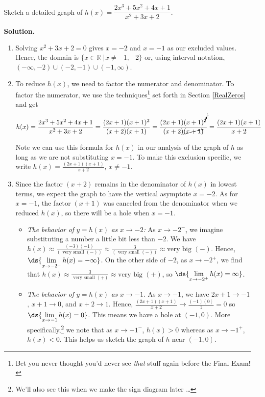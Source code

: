 \documentclass{ximera}
\begin{document}
\begin{example}  Sketch a detailed graph of $h(x) = \dfrac{2x^3+5x^2+4x+1}{x^2+3x+2}$.

{ \bf Solution.}  

\begin{enumerate}

\item   Solving $x^2+3x+2 = 0$ gives $x = -2$ and $x=-1$ as our excluded values.  Hence, the domain is $\{ x \in \mathbb{R} \, | \, x \neq -1, -2 \}$ or, using interval notation,  $(-\infty, -2) \cup (-2, -1) \cup (-1, \infty)$.

\item  To reduce $h(x)$, we need to factor the numerator and denominator.  To factor the numerator, we use the techniques\footnote{Bet you never thought you'd never see \textit{that} stuff again before the Final Exam!} set forth in Section \ref{RealZeros} and get  \[h(x) =  \dfrac{2x^3+5x^2+4x+1}{x^2+3x+2} = \dfrac{(2x+1)(x+1)^2}{(x+2)(x+1)} = \dfrac{ (2x+1) (x+1)^{\cancelto{1}{2}}  }{(x+2)\cancel{(x+1)}} = \dfrac{(2x+1)(x+1)}{x+2} \]

Note we can use this formula for $h(x)$ in our analysis of the graph of $h$ as long as we are not substituting $x=-1$.  To make this exclusion specific, we write $h(x) = \frac{(2x+1)(x+1)}{x+2}$, $x \neq -1$.

\item  Since the factor $(x+2)$ remains in the denominator of $h(x)$ in lowest terms, we expect the graph to have the vertical asymptote $x=-2$.  As for $x=-1$, the factor $(x+1)$ was canceled from the denominator when we reduced $h(x)$, so there will be a hole when $x=-1$.   

\begin{itemize}

\item  \textit{The behavior of $y=h(x)$ as $x \rightarrow -2$:}  As $x \rightarrow -2^{-}$, we imagine substituting a number a little bit less than $-2$. We have $h(x) \approx \frac{(-3)(-1)}{(\text{ very small $(-)$})} \approx \frac{3}{(\text{ very small $(-)$})}\approx \text{very big $(-)$}$.  Hence,  $\ds{\lim_{x \rightarrow -2^{-}} h(x) = - \infty}$.  On the other side of $-2$, as $x \rightarrow -2^{+}$, we find that $h(x) \approx \frac{3}{\text{ very small $(+)$}} \approx \text{very big $(+)$}$, so  $\ds{\lim_{x \rightarrow -2^{+}} h(x) =  \infty}$.

\item  \textit{The behavior of $y=h(x)$ as $x \rightarrow -1$.}    As $x \rightarrow -1$, we have $2x+1 \rightarrow -1$, $x+1 \rightarrow 0$, and $x+2 \rightarrow 1$.  Hence, $\frac{(2x+1)(x+1)}{x+2} \rightarrow \frac{(-1)(0)}{1} = 0$ so $\ds{\lim_{x \rightarrow -1} h(x) = 0}$.  This means we have a hole at $(-1,0)$.  More specifically,\footnote{We'll also see this  when we make the sign diagram later \ldots} we note that as $x \rightarrow -1^{-}$,  $h(x) > 0$ whereas as $x \rightarrow -1^{+}$, $h(x) < 0$. This helps us sketch the graph of $h$ near $(-1,0)$.


\end{itemize}
\end{enumerate}
\end{example}
\end{document}
